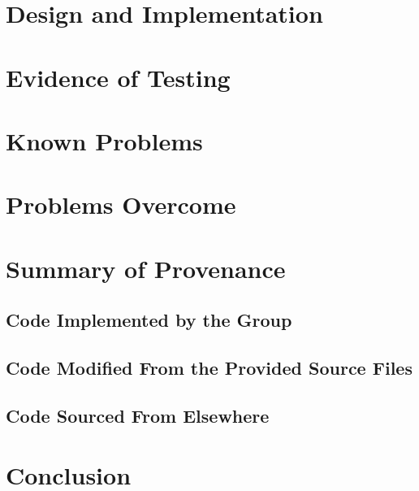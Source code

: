 \documentclass[11]{article}
\begin{document}
	\section{Design and Implementation}

		
	\section{Evidence of Testing}	

		
	\section{Known Problems}

		
	\section{Problems Overcome}

	\section{Summary of Provenance}
			\subsection{Code Implemented by the Group} 

			\subsection{Code Modified From the Provided Source Files}

			\subsection{Code Sourced From Elsewhere}
				
	
\section{Conclusion}
\end{document}
